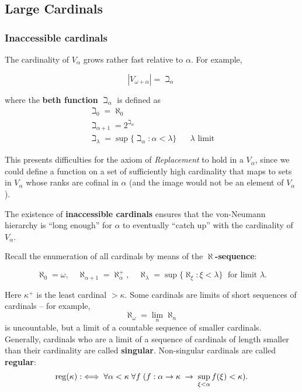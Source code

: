 \subsection{Large Cardinals}

\subsubsection{Inaccessible cardinals}

The cardinality of $V_\alpha$ grows rather fast relative to $\alpha$. For example,

\begin{equation}
|V_{\omega+\alpha}| = \beth_\alpha
\end{equation}

where the \textbf{beth function} $\beth_\alpha$ is defined as
\begin{gather*}
    \beth_0 = \aleph_0 \\
    \beth_{\alpha+1} = 2^{\beth_\alpha} \\
    \beth_{\lambda} = \sup \{ \beth_\alpha \colon \alpha < \lambda\} \quad \text{ $\lambda$ limit}
\end{gather*}

This presents difficulties for the axiom of \textit{Replacement} to hold in a $V_\alpha$, since we could define a function on a set of sufficiently high cardinality that maps to sets in $V_\alpha$ whose ranks are cofinal in $\alpha$ (and the image would not be an element of $V_\alpha$).

The existence of \textbf{inaccessible cardinals} ensures that the von-Neumann hierarchy is ``long enough'' for $\alpha$ to eventually ``catch up'' with the cardinality of $V_\alpha$.

Recall the enumeration of all cardinals by means of the \textbf{$\aleph$-sequence}:

\begin{equation*}
\aleph_0 = \omega, \quad \aleph_{\alpha+1} = \aleph_\alpha^+, \quad  \aleph_\lambda = \sup \{ \aleph_\xi \colon \xi<\lambda\} \; \text{ for limit } \lambda.
\end{equation*}

Here $\kappa^+$ is the least cardinal $> \kappa$. Some cardinals are limits of short sequences of cardinals -- for example,
\begin{equation*}
\aleph_\omega = \lim_n \aleph_n
\end{equation*}
is uncountable, but a limit of a countable sequence of smaller cardinals. Generally, cardinals who are a limit of a sequence of cardinals of length smaller than their cardinality are called \textbf{singular}. Non-singular cardinals are called \textbf{regular}:
\begin{equation*}
\operatorname{reg}(\kappa): \iff \forall \alpha < \kappa \;  \forall f \;( f: \alpha \to \kappa \;  \to \; \sup_{\xi < \alpha} f(\xi) < \kappa).
\end{equation*}

